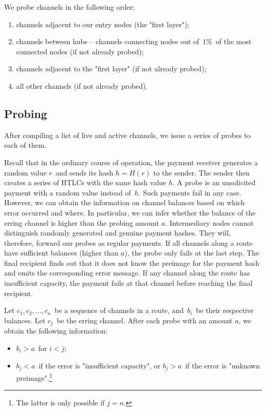 We probe channels in the following order:

\begin{enumerate}
	\item channels adjacent to our entry nodes (the "first layer");
	\item channels between hubs -- channels connecting nodes out of~$1\%$~of the most connected nodes (if not already probed);
	\item channels adjacent to the "first layer" (if not already probed);
	\item all other channels (if not already probed).
\end{enumerate}

\subsection{Probing}

After compiling a list of live and active channels, we issue a series of probes to each of them.

Recall that in the ordinary course of operation, the payment receiver generates a random value $r$~and sends its hash $h = H(r)$ to the sender.
The sender then creates a series of HTLCs with the same hash value $h$.
A probe is an unsolicited payment with a random value instead of~$h$.
Such payments fail in any case.
However, we can obtain the information on channel balances based on which error occurred and where.
In particular, we can infer whether the balance of the erring channel is higher than the probing amount $a$.
Intermediary nodes cannot distinguish randomly generated and genuine payment hashes.
They will, therefore, forward our probes as regular payments.
If all channels along a route have sufficient balances (higher than $a$), the probe only fails at the last step.
The final recipient finds out that it does not know the preimage for the payment hash and emits the corresponding error message.
If any channel along the route has insufficient capacity, the payment fails at that channel before reaching the final recipient.

Let $c_1, c_2, \dots, c_n$~be a sequence of channels in a route, and~$b_i$~be their respective balances.
Let $c_j$~be the erring channel.
After each probe with an amount $a$, we obtain the following information:
\begin{itemize}
	\item $b_i > a$~for $i<j$;
	\item $b_j < a$~if the error is "insufficient capacity", or $b_j > a$~if the error is "unknown preimage".\footnote{The latter is only possible if $j=n$.}
\end{itemize}

